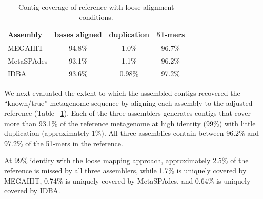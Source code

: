 \documentclass[11pt]{article}
\begin{document}




\begin{table}[!h]
\centering
\caption{Contig coverage of reference with loose alignment conditions.}
\begin{tabular}{|l|c|c|c|}\hline
  \textbf{Assembly} & \textbf{bases aligned} & \textbf{duplication}
  & \textbf{51-mers}
  \\ \hline
MEGAHIT & 94.8\% & 1.0\% & 96.7\% \\ \hline
MetaSPAdes  & 93.1\% & 1.1\% & 96.2\% \\ \hline
IDBA    & 93.6\% & 0.98\% & 97.2\% \\ \hline
\end{tabular}
\label{table:contig-coverage}
\end{table}


We next evaluated the extent to which the assembled contigs recovered the
``known/true'' metagenome sequence by aligning each assembly to the
adjusted reference (Table ~\ref{table:contig-coverage}).  Each of the three
assemblers generates contigs that cover more than 93.1\% of the reference
metagenome at high identity (99\%) with little duplication
(approximately 1\%).  All three assemblies contain between 96.2\% and 97.2\% of
the 51-mers in the reference.

At 99\% identity with the loose mapping approach, approximately 2.5\%
of the reference is missed by all three assemblers, while 1.7\% is
uniquely covered by MEGAHIT, 0.74\% is uniquely covered by MetaSPAdes, and
0.64\% is uniquely covered by IDBA.

\end{document}
